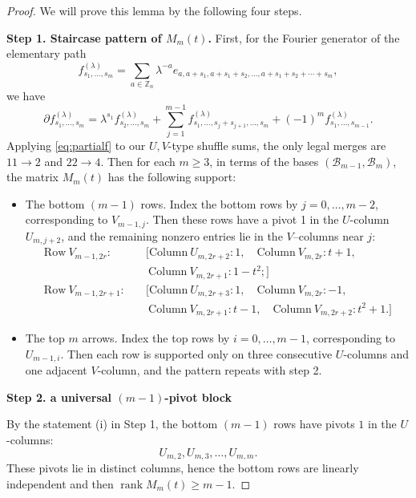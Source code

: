 \documentclass[11pt]{amsart}
\newcommand{\Z}{\mathbb Z}
\newcommand{\rank}{\operatorname{rank}}
\theoremstyle{plain}
\theoremstyle{definition}
\numberwithin{equation}{section}
\begin{document}
\begin{proof} We will prove this lemma by the following four steps.

\smallskip
\noindent\textbf{Step 1. Staircase pattern of $M_m(t)$.}
First, for the Fourier generator of the elementary path
\[f_{s_1,\ldots,s_m}^{(\lambda)}=\sum_{a\in\Z_n}\lambda^{-a}e_{a,a+s_1,a+s_1+s_2,\ldots,a+s_1+s_2+\cdots+s_m},\]
we have
\begin{equation}\label{eq:partialf}
\partial f_{s_1,\ldots,s_m}^{(\lambda)}=\lambda^{s_1}f_{s_2,\ldots,s_m}^{(\lambda)}+\sum_{j=1}^{m-1}f_{s_1,\ldots,s_j+s_{j+1},\ldots,s_m}^{(\lambda)}+(-1)^mf_{s_1,\ldots,s_{m-1}}^{(\lambda)}.
\end{equation}
Applying \eqref{eq:partialf} to our $U,V$-type shuffle sums, the only legal merges are $11\rightarrow2$ and $22\rightarrow4$. Then for each $m\ge3$, in terms of the bases $(\mathcal{B}_{m-1},\mathcal{B}_m)$, the matrix
$M_m(t)$ has the following support:
\begin{itemize}
    \item[(i)] The bottom $(m-1)$ rows. Index the bottom rows by $j=0,\ldots,m-2$, corresponding to $V_{m-1,j}$.
Then these rows have a pivot 1 in the $U$-column $U_{m,j+2}$, and the remaining nonzero entries lie in
the $V$–columns near $j$:
\begin{align*}
    \mathrm{Row}~ V_{m-1,2r}:& \quad[\mathrm{Column}~U_{m,2r+2}:1,\quad \mathrm{Column}~V_{m,2r}:t+1,\\
    &~\quad\mathrm{Column}~V_{m,2r+1}:1-t^2;] \\
    \mathrm{Row}~ V_{m-1,2r+1}:& \quad[\mathrm{Column}~U_{m,2r+3}:1,\quad \mathrm{Column}~V_{m,2r}:-1,\\
    &~\quad
    \mathrm{Column}~V_{m,2r+1}:t-1,\quad
    \mathrm{Column}~V_{m,2r+2}:t^2+1.] 
\end{align*}
\item[(ii)] The top $m$ arrows. Index the top rows by $i=0,\ldots,m-1$, corresponding to $U_{m-1,i}$. Then each
row is supported only on three consecutive $U$-columns and one adjacent $V$-column, and the pattern repeats with step 2. 
\end{itemize}


\medskip
\noindent\textbf{Step 2. a universal $(m-1)$-pivot block}

By the statement (i) in Step 1, the bottom $(m-1)$ rows have pivots $1$ in the $U$-columns:
\[U_{m,2},U_{m,3},\ldots,U_{m,m}.\]
These pivots lie in distinct columns, hence the bottom rows are linearly independent and then $\rank M_m(t)\ge m-1$. 



\end{proof}
\end{document}
